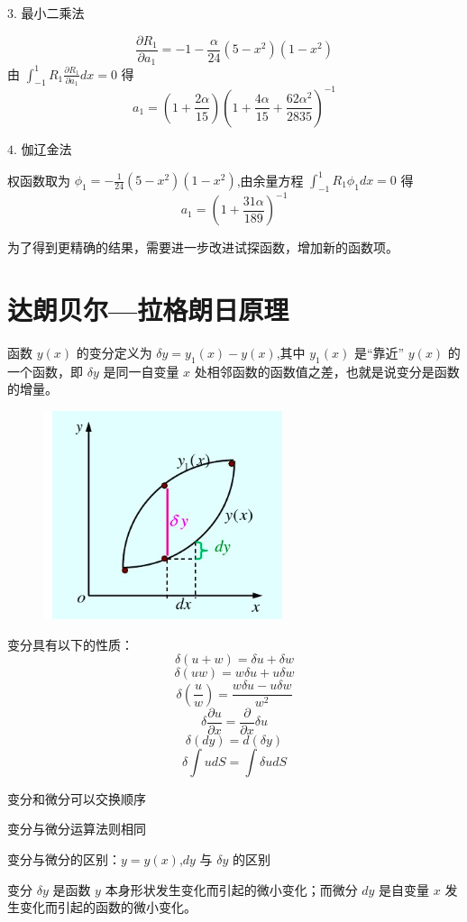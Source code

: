 \documentclass[12pt,a4paper]{article}
\begin{document}
$3$. 最小二乘法

$$
\frac{\partial R_1}{\partial a_1}=-1-\frac{\alpha}{24}(5-x^2)(1−x^2)
$$
由 $\int_{-1}^{1} R_1\frac{\partial R_1}{\partial a_1}dx=0$ 得
$$
a_1=(1+\frac{2\alpha}{15})(1+\frac{4\alpha}{15}+\frac{62\alpha ^2}{2835})^{-1}
$$

$4$. 伽辽金法

权函数取为 $\phi_1=−\frac{1}{24}(5-x^2)(1−x^2)$,由余量方程 $\int_{-1}^{1} R_1\phi_1dx=0$ 得
$$
a_1=(1+\frac{31\alpha}{189})^{-1}
$$

为了得到更精确的结果，需要进一步改进试探函数，增加新的函数项。

\section{达朗贝尔—拉格朗日原理}
函数 $y(x)$ 的变分定义为 $\delta y=y_1(x)-y(x)$,其中 $y_1(x)$ 是“靠近” $y(x)$ 的一个函数，即 
$\delta y$ 是同一自变量 $x$ 处相邻函数的函数值之差，也就是说变分是函数的增量。

\begin{figure}[H]
\centering
\includegraphics[scale=0.6]{./figures/3.png}
\caption{}
\end{figure}

变分具有以下的性质：
$$
\delta (u+w)=\delta u+\delta w
$$
$$
\delta (uw)=w\delta u+u\delta w
$$
$$
\delta (\frac{u}{w})=\frac{w\delta u-u\delta w}{w^2}
$$
$$
\delta\frac{\partial u}{\partial x}=\frac{\partial}{\partial x}\delta u
$$
$$
\delta (dy)=d(\delta y)
$$
$$
\delta\int udS=\int\delta udS
$$

变分和微分可以交换顺序

变分与微分运算法则相同

变分与微分的区别：$y=y(x)$,$dy$ 与 $\delta y$ 的区别

变分 $\delta y$ 是函数 $y$ 本身形状发生变化而引起的微小变化；而微分 $dy$ 是自变量 $x$ 发生变化而引起的函数的微小变化。
\end{document}
